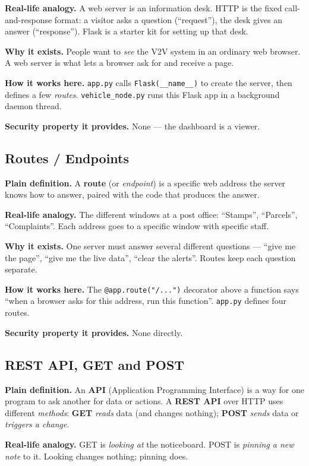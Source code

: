\documentclass[11pt,a4paper]{report}
\begin{document}
\textbf{Real-life analogy.} A web server is an information desk. HTTP is the
fixed call-and-response format: a visitor asks a question (``request''), the desk
gives an answer (``response''). Flask is a starter kit for setting up that desk.

\textbf{Why it exists.} People want to \emph{see} the V2V system in an ordinary
web browser. A web server is what lets a browser ask for and receive a page.

\textbf{How it works here.} \texttt{app.py} calls \texttt{Flask(\_\_name\_\_)} to
create the server, then defines a few \emph{routes}. \texttt{vehicle\_node.py}
runs this Flask app in a background daemon thread.

\textbf{Security property it provides.} None --- the dashboard is a viewer.

\subsection{Routes / Endpoints}
\textbf{Plain definition.} A \textbf{route} (or \emph{endpoint}) is a specific
web address the server knows how to answer, paired with the code that produces
the answer.

\textbf{Real-life analogy.} The different windows at a post office: ``Stamps'',
``Parcels'', ``Complaints''. Each address goes to a specific window with specific
staff.

\textbf{Why it exists.} One server must answer several different questions ---
``give me the page'', ``give me the live data'', ``clear the alerts''. Routes
keep each question separate.

\textbf{How it works here.} The \texttt{@app.route("/...")} decorator above a
function says ``when a browser asks for this address, run this function''.
\texttt{app.py} defines four routes.

\textbf{Security property it provides.} None directly.

\subsection{REST API, GET and POST}
\textbf{Plain definition.} An \textbf{API} (Application Programming Interface) is
a way for one program to ask another for data or actions. A \textbf{REST API}
over HTTP uses different \emph{methods}: \textbf{GET} \emph{reads} data (and
changes nothing); \textbf{POST} \emph{sends} data or \emph{triggers a change}.

\textbf{Real-life analogy.} GET is \emph{looking at} the noticeboard. POST is
\emph{pinning a new note} to it. Looking changes nothing; pinning does.
\end{document}
